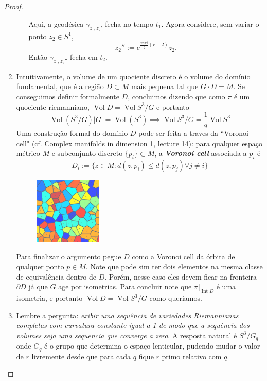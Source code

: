 \begin{proof}
\begin{enumerate}[label=(\alph*)]
\begin{enumerate}[label=(\roman*)]
Aqui, a geodésica \(\gamma_{z_1,z_2'}\) fecha no tempo \(t_1\). Agora considere, sem variar o ponto \(z_2 \in S^1\),
\[z_2'':=e^{\frac{2n\pi i}{q}(r-2)}z_2.\]
Então \(\gamma_{z_1,z_2''}\) fecha em \(t_2\).\fi
\end{enumerate}
\item Intuitivamente, o volume de um quociente discreto é o volume do domínio fundamental, que é a região \(D\subset M\) mais pequena tal que \(G\cdot D=M\). Se conseguimos definir formalmente \(D\), concluimos dizendo que como \(\pi\) é um quociente riemanniano, \(\operatorname{Vol}D=\operatorname{Vol}S^3/G\) e portanto
\[\operatorname{Vol}(S^3/G)|G|=\operatorname{Vol}(S^3)\implies \operatorname{Vol}S^3/G=\frac{1}{q}\operatorname{Vol}S^3\]
Uma construção formal do domínio \(D\) pode ser feita a traves da ``Voronoi cell" (cf. Complex manifolds in dimension 1, lecture 14): para qualquer espaço métrico \(M\) e subconjunto discreto \(\{p_i\} \subset M\), a \textit{\textbf{Voronoi cell}} associada a \(p_i\) é
\[D_i:=\{z \in M: d(z,p_i) \leq d(z,p_j) \forall j\neq i\}\]
\begin{figure}[H]
	\centering
	\includegraphics[width=0.3\textwidth]{fig7}
\end{figure}
Para finalizar o argumento pegue \(D\) como a  Voronoi cell da  órbita de qualquer ponto \(p \in M\). Note que pode sim ter dois elementos na mesma classe de equivalência dentro de \(D\). Porém, nesse caso eles devem ficar na fronteira \(\partial D\) já que \(G\) age por isometrias. Para concluir note que \(\pi|_{\operatorname{Int}D}\) é uma isometria, e portanto \(\operatorname{Vol}D=\operatorname{Vol}S^3/G\) como queriamos.
\item Lembre a pergunta: \textit{exibir uma sequência de variedades Riemannianas completas com curvatura constante igual a 1 de modo que a sequência dos volumes seja uma sequencia que converge a zero}. A resposta natural é \(S^3/G_q\) onde \(G_q\) é o grupo que determina o espaço lenticular, pudendo mudar o valor de \(r\) livremente desde que para cada \(q\) fique \(r\) primo relativo com \(q\).


\end{enumerate}
\end{proof}
